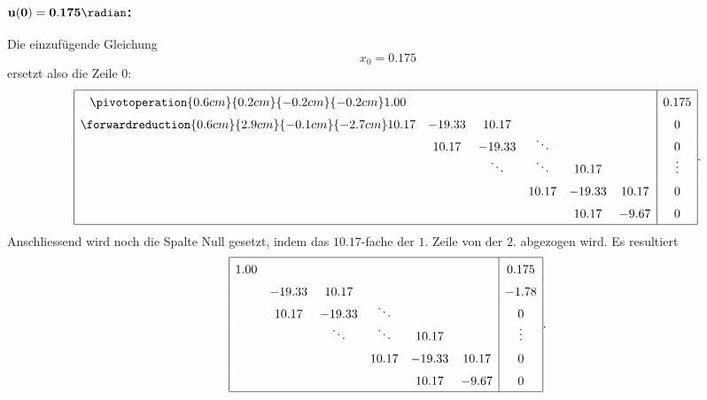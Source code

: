 \subsubsection{$\mathbf{u(0) = 0.175 \radian}$:}
Die einzufügende Gleichung
\begin{equation}
    x_0 = 0.175
\end{equation}
ersetzt also die Zeile $0$:
\begin{equation}
    \def\arraystretch{1.5}
    \begin{array}{|cccccc|c|}
        \hline
        \pivotoperation{0.6cm}{0.2cm}{-0.2cm}{-0.2cm}
         1.00  &        &                &                &        &        & 0.175          \\
        \forwardreduction{0.6cm}{2.9cm}{-0.1cm}{-2.7cm}
        10.17  &-19.33  & 10.17          &                &        &        & 0              \\
               & 10.17  &-19.33          & \smash{\ddots} &        &        & 0              \\
               &        & \smash{\ddots} & \smash{\ddots} & 10.17  &        & \smash{\vdots} \\
               &        &                & 10.17          &-19.33  & 10.17  & 0              \\
               &        &                &                & 10.17  & -9.67  & 0              \\
        \hline
    \end{array}.
\end{equation}
Anschliessend wird noch die Spalte Null gesetzt, indem das $ 10.17 $-fache der $1$. Zeile von der $2$. abgezogen wird.
Es resultiert
\begin{equation}
    \def\arraystretch{1.5}
    \begin{array}{|cccccc|c|}
        \hline
         1.00  &        &                &                &        &        & 0.175          \\ 
               &-19.33  & 10.17          &                &        &        & -1.78          \\
               & 10.17  &-19.33          & \smash{\ddots} &        &        & 0              \\
               &        & \smash{\ddots} & \smash{\ddots} & 10.17  &        & \smash{\vdots} \\
               &        &                & 10.17          &-19.33  & 10.17  & 0              \\
               &        &                &                & 10.17  & -9.67  & 0              \\
        \hline
    \end{array}.
\end{equation}

